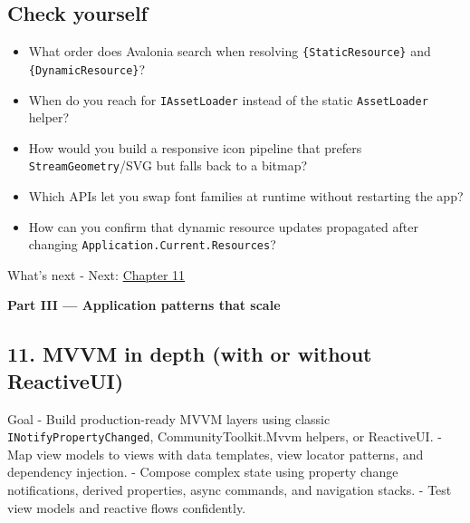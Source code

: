 \subsection{Check yourself}\label{check-yourself-8}

\begin{itemize}
\tightlist
\item
  What order does Avalonia search when resolving
  \passthrough{\lstinline!\{StaticResource\}!} and
  \passthrough{\lstinline!\{DynamicResource\}!}?
\item
  When do you reach for \passthrough{\lstinline!IAssetLoader!} instead
  of the static \passthrough{\lstinline!AssetLoader!} helper?
\item
  How would you build a responsive icon pipeline that prefers
  \passthrough{\lstinline!StreamGeometry!}/SVG but falls back to a
  bitmap?
\item
  Which APIs let you swap font families at runtime without restarting
  the app?
\item
  How can you confirm that dynamic resource updates propagated after
  changing \passthrough{\lstinline!Application.Current.Resources!}?
\end{itemize}

What's next - Next: \href{Chapter11.md}{Chapter 11}

\clearpage
{}
{}
\thispagestyle{empty}
\vspace*{\fill}
\begin{center}
{\Huge\bfseries Part III — Application patterns that scale}
\end{center}
\vspace*{\fill}
\clearpage

\newpage

\subsection{11. MVVM in depth (with or without
ReactiveUI)}\label{mvvm-in-depth-with-or-without-reactiveui}

Goal - Build production-ready MVVM layers using classic
\passthrough{\lstinline!INotifyPropertyChanged!}, CommunityToolkit.Mvvm
helpers, or ReactiveUI. - Map view models to views with data templates,
view locator patterns, and dependency injection. - Compose complex state
using property change notifications, derived properties, async commands,
and navigation stacks. - Test view models and reactive flows
confidently.

